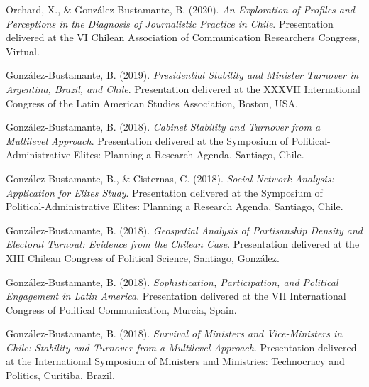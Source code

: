 \begin{publications}
\begin{benumerate}{66}
\item{\small Orchard, X., \& González-Bustamante, B. (2020). {\itshape An Exploration of Profiles and Perceptions in the Diagnosis of Journalistic Practice in Chile}. Presentation delivered at the VI Chilean Association of Communication Researchers Congress, Virtual.}\vspace{1mm}

\item{\small González-Bustamante, B. (2019). {\itshape Presidential Stability and Minister Turnover in Argentina, Brazil, and Chile}. Presentation delivered at the XXXVII International Congress of the Latin American Studies Association, Boston, USA.}\vspace{1mm}

\item{\small González-Bustamante, B. (2018). {\itshape Cabinet Stability and Turnover from a Multilevel Approach}. Presentation delivered at the Symposium of Political-Administrative Elites: Planning a Research Agenda, Santiago, Chile.}\vspace{1mm}

\item{\small González-Bustamante, B., \& Cisternas, C. (2018). {\itshape Social Network Analysis: Application for Elites Study}. Presentation delivered at the Symposium of Political-Administrative Elites: Planning a Research Agenda, Santiago, Chile.}\vspace{1mm}

\item{\small González-Bustamante, B. (2018). {\itshape Geospatial Analysis of Partisanship Density and Electoral Turnout: Evidence from the Chilean Case}. Presentation delivered at the XIII Chilean Congress of Political Science, Santiago, González.}\vspace{1mm}

\item{\small González-Bustamante, B. (2018). {\itshape Sophistication, Participation, and Political Engagement in Latin America}. Presentation delivered at the VII International Congress of Political Communication, Murcia, Spain.}\vspace{1mm}

\item{\small González-Bustamante, B. (2018). {\itshape Survival of Ministers and Vice-Ministers in Chile: Stability and Turnover from a Multilevel Approach}. Presentation delivered at the International Symposium of Ministers and Ministries: Technocracy and Politics, Curitiba, Brazil.}\vspace{1mm}


\end{benumerate}
\end{publications}
